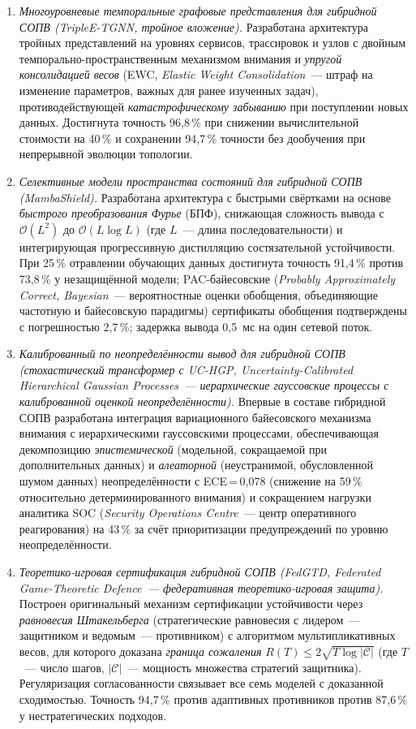 \documentclass[12pt,a5paper]{article}
\begin{document}
\begin{enumerate}
\item \textit{Многоуровневые темпоральные графовые
представления для гибридной СОПВ (TripleE-TGNN, тройное
вложение).} Разработана архитектура тройных представлений
на уровнях сервисов, трассировок и узлов с двойным
темпорально-пространственным механизмом внимания и
\emph{упругой консолидацией весов} (EWC,
\emph{Elastic Weight Consolidation}~--- штраф на изменение
параметров, важных для ранее изученных задач), противодействующей
\emph{катастрофическому забыванию} при поступлении новых
данных. Достигнута точность 96,8\,\% при снижении
вычислительной стоимости на 40\,\% и сохранении 94,7\,\%
точности без дообучения при непрерывной эволюции топологии.

\item \textit{Селективные модели пространства состояний для
гибридной СОПВ (MambaShield).} Разработана архитектура с
быстрыми свёртками на основе \emph{быстрого преобразования
Фурье} (БПФ), снижающая сложность вывода с
$\mathcal{O}(L^2)$ до $\mathcal{O}(L\log L)$ (где $L$~---
длина последовательности) и интегрирующая прогрессивную
дистилляцию состязательной устойчивости. При 25\,\%
отравлении обучающих данных достигнута точность 91,4\,\%
против 73,8\,\% у незащищённой модели; PAC-байесовские
(\emph{Probably Approximately Correct, Bayesian}~---
вероятностные оценки обобщения, объединяющие частотную и
байесовскую парадигмы) сертификаты обобщения подтверждены с
погрешностью 2,7\,\%; задержка вывода 0,5~мс на один
сетевой поток.

\item \textit{Калиброванный по неопределённости вывод для
гибридной СОПВ (стохастический трансформер с UC-HGP,
\emph{Uncertainty-Calibrated Hierarchical Gaussian
Processes}~--- иерархические гауссовские процессы с
калиброванной оценкой неопределённости).} Впервые в составе
гибридной СОПВ разработана интеграция вариационного
байесовского механизма внимания с иерархическими
гауссовскими процессами, обеспечивающая декомпозицию
\emph{эпистемической} (модельной, сокращаемой при
дополнительных данных) и \emph{алеаторной} (неустранимой,
обусловленной шумом данных) неопределённости с
ECE\,=\,0,078 (снижение на 59\,\% относительно
детерминированного внимания) и сокращением нагрузки
аналитика SOC (\emph{Security Operations Centre}~--- центр
оперативного реагирования) на 43\,\% за счёт приоритизации
предупреждений по уровню неопределённости.

\item \textit{Теоретико-игровая сертификация гибридной СОПВ
(FedGTD, \emph{Federated Game-Theoretic Defence}~---
федеративная теоретико-игровая защита).} Построен
оригинальный механизм сертификации устойчивости через
\emph{равновесия Штакельберга} (стратегические равновесия
с лидером~--- защитником и ведомым~--- противником) с
алгоритмом мультипликативных весов, для которого доказана
\emph{граница сожаления}
$R(T)\le 2\sqrt{T\log|\mathcal{C}|}$ (где $T$~--- число
шагов, $|\mathcal{C}|$~--- мощность множества стратегий
защитника). Регуляризация согласованности связывает все семь
моделей с доказанной сходимостью. Точность 94,7\,\%
против адаптивных противников против 87,6\,\% у
нестратегических подходов.


\end{enumerate}
\end{document}
